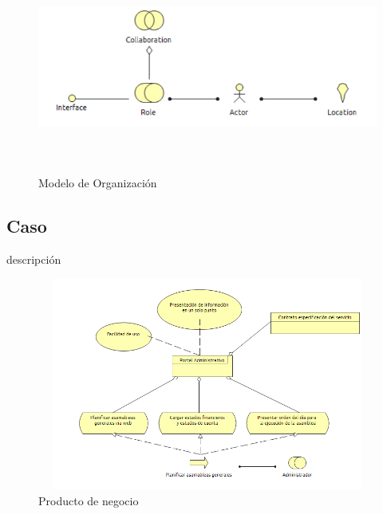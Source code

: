 \begin{figure}[th!]
	\centering
	\includegraphics[width=12cm,height=7cm]{arquitectura/negocio/imgs/m_organizacion}
	\caption{Modelo de Organización}
\end{figure}

\newpage
\subsection{Caso}
descripción

\begin{figure}[th!]
	\centering
	\includegraphics[width=12cm,height=7cm]{arquitectura/negocio/imgs/producto}
	\caption{Producto de negocio}
\end{figure}
\newpage